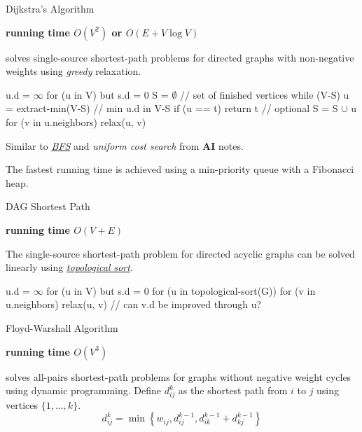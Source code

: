 \documentclass{cognito}
\begin{document}
\begin{note}{Dijkstra's Algorithm}
	\begin{mdframed}[linecolor=black!25!white]
		\bf running time $O(V^2)$ or $O(E + V \log V)$
	\end{mdframed}
	 solves single-source shortest-path problems for directed graphs with non-negative weights using \emph{greedy} relaxation.
		\begin{largecode}
 u.d = $\infty$ for (u in V) but s.d = 0
 S = $\emptyset$  // set of finished vertices
 while (V-S)
	u = extract-min(V-S)  // min u.d in V-S
	if (u == t) return t  // optional
	S = S $\cup$ { u }
	for (v in u.neighbors) relax(u, v)
	\end{largecode}
\begin{remark} Similar to \hyperref[note:Breadth-First Search]{\it BFS} and \emph{uniform cost search} from \textbf{AI} \noteref notes. \end{remark}
\begin{remark} The fastest running time is achieved using a min-priority queue with a Fibonacci heap. \end{remark}\vspace{-5pt}
\end{note}

\begin{note}{DAG Shortest Path}
	\begin{mdframed}[linecolor=black!25!white]
		\bf running time $O(V + E)$
	\end{mdframed}
	The single-source shortest-path problem for directed acyclic graphs can be solved linearly using \hyperref[note:Topological Sort]{\it topological sort}.
	\begin{largecode}
 u.d = $\infty$ for (u in V) but s.d = 0
 for (u in topological-sort(G))
	for (v in u.neighbors)
		relax(u, v)  // can v.d be improved through u?
	\end{largecode}
	\vspace{-5pt}
\end{note}

\begin{note}{Floyd-Warshall Algorithm}
	\begin{mdframed}[linecolor=black!25!white]
		\bf running time $O(V^3)$
	\end{mdframed}
	 solves all-pairs shortest-path problems for graphs without negative weight cycles using dynamic programming.
	Define $d_{ij}^{k}$ as the shortest path from $i$ to $j$ using vertices $\{1, ..., k\}$.
	$$
		d_{ij}^k = \min \left\{w_{ij}, d_{ij}^{k-1}, d_{ik}^{k-1} + d_{kj}^{k-1}\right\}
	$$
	\vspace{-10pt}
\end{note}
\end{document}
